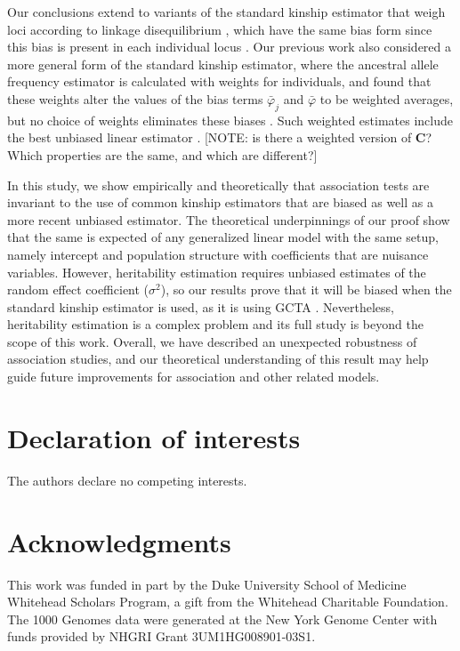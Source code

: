 \documentclass[11pt]{article}
\newcommand{\kinMat}{%
  \ensuremath{%
    \mathbf{\Phi}
  }%
  \xspace%
}%
\begin{document}
Our conclusions extend to variants of the standard kinship estimator that weigh loci according to linkage disequilibrium \citep{speed_reevaluation_2017, wang_efficient_2017}, which have the same bias form since this bias is present in each individual locus \citep{ochoa_estimating_2021}.
Our previous work also considered a more general form of the standard kinship estimator, where the ancestral allele frequency estimator \pith is calculated with weights for individuals, and found that these weights alter the values of the bias terms $\bar{\varphi}_j$ and $\bar{\varphi}$ to be weighted averages, but no choice of weights eliminates these biases \citep{ochoa_estimating_2021}.
Such weighted \pith estimates include the best unbiased linear estimator \citep{astle_population_2009, thornton_roadtrips:_2010}.
[NOTE: is there a weighted version of $\mathbf{C}$?  Which properties are the same, and which are different?]

In this study, we show empirically and theoretically that association tests are invariant to the use of common kinship estimators that are biased as well as a more recent unbiased estimator.
The theoretical underpinnings of our proof show that the same is expected of any generalized linear model with the same setup, namely intercept and population structure with coefficients that are nuisance variables.
However, heritability estimation requires unbiased estimates of the random effect coefficient ($\sigma^2$), so our results prove that it will be biased when the standard kinship estimator is used, as it is using GCTA \citep{yang_gcta:_2011, yang_advantages_2014}.
Nevertheless, heritability estimation is a complex problem and its full study is beyond the scope of this work.
Overall, we have described an unexpected robustness of association studies, and our theoretical understanding of this result may help guide future improvements for association and other related models.



\section*{Declaration of interests}
The authors declare no competing interests.

\section*{Acknowledgments}
This work was funded in part by the Duke University School of Medicine Whitehead Scholars Program, a gift from the Whitehead Charitable Foundation.
The 1000 Genomes data were generated at the New York Genome Center with funds provided by NHGRI Grant 3UM1HG008901-03S1.
\end{document}
